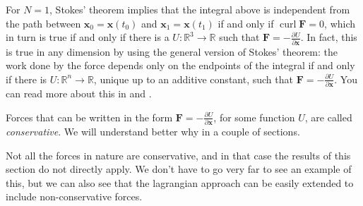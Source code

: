 \documentclass[english,fontsize=11pt,paper=a5,oneside]{scrbook}
\newcommand{\R}{\mathbb{R}}
\newcommand{\bx}{\bm{x}}
\DeclareMathOperator{\curl}{curl}
\theoremstyle{definition}
\newenvironment{remark}
  {\pushQED{\qed}\renewcommand{\qedsymbol}{$\lozenge$}\remarkx}
  {\popQED\endremarkx}
\begin{document}
\begin{remark}
  For $N=1$, Stokes' theorem implies that the integral above is independent from the path between $\bx_0 = \bx(t_0)$ and $\bx_1 = \bx(t_1)$ if and only if $\curl \bm{F} = 0$, which in turn is true if and only if there is a $U:\R^3\to\R$ such that $\bm{F} = -\frac{\partial U}{\partial \bm{x}}$.
  In fact, this is true in any dimension by using the general version of Stokes' theorem: the work done by the force depends only on the endpoints of the integral if and only if there is $U:\R^n\to\R$, unique up to an additive constant, such that $\bm{F} = -\frac{\partial U}{\partial \bm{x}}$.
  You can read more about this in \cite[Chapter 2.5]{book:arnold} and \cite[Theorem 6.3 and 8.1]{book:knauf}.
\end{remark}

Forces that can be written in the form $\bm{F} = -\frac{\partial U}{\partial \bm{x}}$, for some function $U$, are called \emph{conservative}.
We will understand better why in a couple of sections.

Not all the forces in nature are conservative, and in that case the results of this section do not directly apply.
We don't have to go very far to see an example of this, but we can also see that the lagrangian approach can be easily extended to include non-conservative forces.
\end{document}
